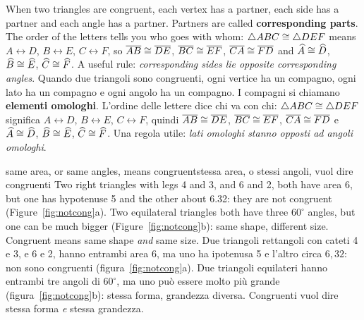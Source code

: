 \begin{bi}
When two triangles are congruent, each vertex has a partner, each side has a partner and each angle has a partner. Partners are called \textbf{corresponding parts}. The order of the letters tells you who goes with whom: $\triangle ABC \cong \triangle DEF$ means $A \leftrightarrow D$, $B \leftrightarrow E$, $C \leftrightarrow F$, so $\overline{AB} \cong \overline{DE}$, $\overline{BC} \cong \overline{EF}$, $\overline{CA} \cong \overline{FD}$ and $\widehat{A} \cong \widehat{D}$, $\widehat{B} \cong \widehat{E}$, $\widehat{C} \cong \widehat{F}$. A useful rule: \emph{corresponding sides lie opposite corresponding angles}.
\IT
Quando due triangoli sono congruenti, ogni vertice ha un compagno, ogni lato ha un compagno e ogni angolo ha un compagno. I compagni si chiamano \textbf{elementi omologhi}. L'ordine delle lettere dice chi va con chi: $\triangle ABC \cong \triangle DEF$ significa $A \leftrightarrow D$, $B \leftrightarrow E$, $C \leftrightarrow F$, quindi $\overline{AB} \cong \overline{DE}$, $\overline{BC} \cong \overline{EF}$, $\overline{CA} \cong \overline{FD}$ e $\widehat{A} \cong \widehat{D}$, $\widehat{B} \cong \widehat{E}$, $\widehat{C} \cong \widehat{F}$. Una regola utile: \emph{lati omologhi stanno opposti ad angoli omologhi}.
\end{bi}

\begin{trap}{same area, or same angles, means congruent}{stessa area, o stessi angoli, vuol dire congruenti}
Two right triangles with legs 4 and 3, and 6 and 2, both have area 6, but one has hypotenuse 5 and the other about 6.32: they are not congruent (Figure~\ref{fig:notcong}a). Two equilateral triangles both have three $60^\circ$ angles, but one can be much bigger (Figure~\ref{fig:notcong}b): same shape, different size. Congruent means same shape \emph{and} same size.
\tcblower
Due triangoli rettangoli con cateti 4 e 3, e 6 e 2, hanno entrambi area 6, ma uno ha ipotenusa 5 e l'altro circa $6{,}32$: non sono congruenti (figura~\ref{fig:notcong}a). Due triangoli equilateri hanno entrambi tre angoli di $60^\circ$, ma uno può essere molto più grande (figura~\ref{fig:notcong}b): stessa forma, grandezza diversa. Congruenti vuol dire stessa forma \emph{e} stessa grandezza.
\end{trap}


